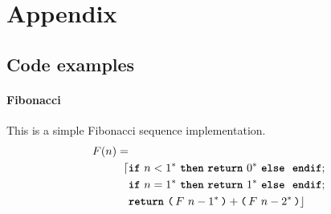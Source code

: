 \section{Appendix}
\subsection{Code examples}
\paragraph{Fibonacci}
This is a simple Fibonacci sequence implementation.
\begin{equation*}
\begin{split}
F(n) = & \\ \lceil
	&\ifstmt{n < 1^*}{\retstmt{0^*}}{};\\
	&\ifstmt{n = 1^*}{\retstmt{1^*}}{};\\
	&\retstmt{\opexp{F}{n - 1^*} + \opexp{F}{n - 2^*}} \rfloor
\end{split}
\end{equation*}